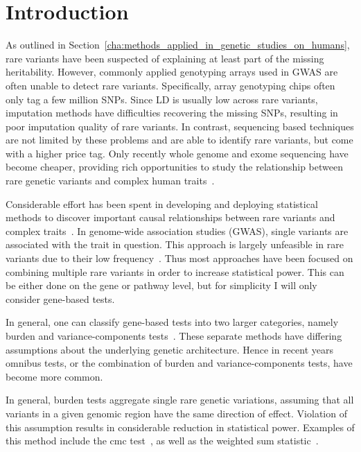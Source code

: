 \section{Introduction}
\label{sec:introduction_ksburden}

As outlined in Section~\ref{cha:methods_applied_in_genetic_studies_on_humans}, rare variants have been suspected of explaining at least part of the missing heritability.
However, commonly applied genotyping arrays used in GWAS are often unable to detect rare variants.
Specifically, array genotyping chips often only tag a few million SNPs.
Since LD is usually low across rare variants, imputation methods have difficulties recovering the missing SNPs, resulting in poor imputation quality of rare variants.
In contrast, sequencing based techniques are not limited by these problems and are able to identify rare variants, but come with a higher price tag.
Only recently whole genome and exome sequencing have become cheaper, providing rich opportunities to study the relationship between rare genetic variants and complex human traits~\cite{Goodwin2016}.

Considerable effort has been spent in developing and deploying statistical methods to discover important causal relationships between rare variants and complex traits~\cite{Morris2010,Zeng2014,Daye2012,Manuscript2013}.
In genome-wide association studies (GWAS), single variants are associated with the trait in question.
This approach is largely unfeasible in rare variants due to their low frequency~\cite{Lee2014}.
Thus most approaches have been focused on combining multiple rare variants in order to increase statistical power.
This can be either done on the gene or pathway level, but for simplicity I will only consider gene-based tests.

In general, one can classify gene-based tests into two larger categories, namely burden and variance-components tests~\cite{Lee2014}.
These separate methods have differing assumptions about the underlying genetic architecture.
Hence in recent years omnibus tests, or the combination of burden and variance-components tests, have become more common.

In general, burden tests aggregate single rare genetic variations, assuming that all variants in a given genomic region have the same direction of effect.
Violation of this assumption results in considerable reduction in statistical power.
Examples of this method include the \acrfull{cmc} test~\cite{Li2008}, as well as the weighted sum statistic~\cite{Madsen2009}.

